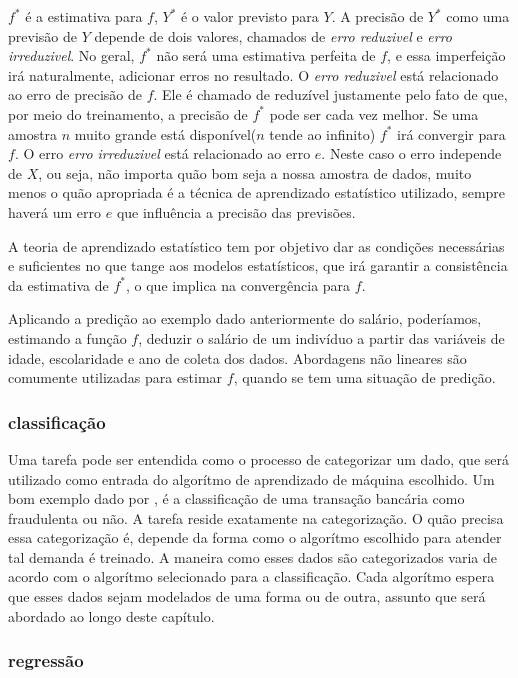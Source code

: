 $f^*$ é a estimativa para $f$, $Y^*$ é o valor previsto para $Y$. A precisão de $Y^*$ como uma previsão de $Y$ depende de dois valores, chamados de \textit{erro reduzivel} e \textit{erro irreduzivel}. No geral, $f^*$ não será uma estimativa perfeita de $f$, e essa imperfeição irá naturalmente, adicionar erros no resultado\cite{Jordan}.
O \textit{erro reduzivel} está relacionado ao erro de precisão de $f$. Ele é chamado de reduzível justamente pelo fato de que, por meio do treinamento, a precisão de $f^*$ pode ser cada vez melhor. Se uma amostra $n$ muito grande está disponível($n$ tende ao infinito) $f^*$ irá convergir para $f$\cite{Malhotra}. 
O erro \textit{erro irreduzivel} está relacionado ao erro $e$. Neste caso o erro independe de $X$, ou seja, não importa quão bom seja a nossa amostra de dados, muito menos o quão apropriada é a técnica de aprendizado estatístico utilizado, sempre haverá um erro $e$ que influência a precisão das previsões\cite{Jordan}.

A teoria de aprendizado estatístico tem por objetivo dar as condições necessárias e suficientes no que tange aos modelos estatísticos, que irá
garantir a consistência da estimativa de $f^*$, o que implica na convergência para $f$\cite{Malhotra}.

Aplicando a predição ao exemplo dado anteriormente do salário, poderíamos, estimando a função $f$, deduzir
o salário de um indivíduo a partir das variáveis de idade, escolaridade e ano de coleta dos dados. Abordagens não lineares
são comumente utilizadas para estimar $f$, quando se tem uma situação de predição.

\subsubsection{classificação}

Uma tarefa pode ser entendida como o processo de categorizar um dado, que será utilizado como entrada do algorítmo de aprendizado de máquina escolhido. Um bom exemplo dado por \cite{Jordan}, é a classificação de uma
transação bancária como fraudulenta ou não. A tarefa reside exatamente na categorização. O quão precisa essa categorização é, depende da forma como o algorítmo escolhido para atender tal demanda é treinado. A maneira como esses dados são categorizados varia de acordo com o algorítmo selecionado para a classificação. Cada algorítmo espera que esses dados sejam modelados de uma forma ou de outra, assunto que será abordado ao longo deste capítulo.


\subsubsection{regressão}

